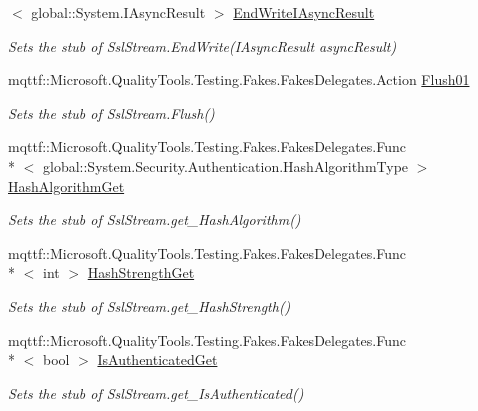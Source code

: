 \begin{DoxyCompactItemize}
$<$ global\-::\-System.\-I\-Async\-Result $>$ \hyperlink{class_system_1_1_net_1_1_security_1_1_fakes_1_1_stub_ssl_stream_aab69be10dcf29d75a2c727837f6e589b}{End\-Write\-I\-Async\-Result}
\begin{DoxyCompactList}\small\item\em Sets the stub of Ssl\-Stream.\-End\-Write(\-I\-Async\-Result async\-Result)\end{DoxyCompactList}\item 
mqttf\-::\-Microsoft.\-Quality\-Tools.\-Testing.\-Fakes.\-Fakes\-Delegates.\-Action \hyperlink{class_system_1_1_net_1_1_security_1_1_fakes_1_1_stub_ssl_stream_adc47c3da205d7e2f128cd9e812fcdea8}{Flush01}
\begin{DoxyCompactList}\small\item\em Sets the stub of Ssl\-Stream.\-Flush()\end{DoxyCompactList}\item 
mqttf\-::\-Microsoft.\-Quality\-Tools.\-Testing.\-Fakes.\-Fakes\-Delegates.\-Func\\*
$<$ global\-::\-System.\-Security.\-Authentication.\-Hash\-Algorithm\-Type $>$ \hyperlink{class_system_1_1_net_1_1_security_1_1_fakes_1_1_stub_ssl_stream_ab262d5b2131d6ca8c1d70eb211203526}{Hash\-Algorithm\-Get}
\begin{DoxyCompactList}\small\item\em Sets the stub of Ssl\-Stream.\-get\-\_\-\-Hash\-Algorithm()\end{DoxyCompactList}\item 
mqttf\-::\-Microsoft.\-Quality\-Tools.\-Testing.\-Fakes.\-Fakes\-Delegates.\-Func\\*
$<$ int $>$ \hyperlink{class_system_1_1_net_1_1_security_1_1_fakes_1_1_stub_ssl_stream_ac022ca28c366a9611d5a66cbdc826cc9}{Hash\-Strength\-Get}
\begin{DoxyCompactList}\small\item\em Sets the stub of Ssl\-Stream.\-get\-\_\-\-Hash\-Strength()\end{DoxyCompactList}\item 
mqttf\-::\-Microsoft.\-Quality\-Tools.\-Testing.\-Fakes.\-Fakes\-Delegates.\-Func\\*
$<$ bool $>$ \hyperlink{class_system_1_1_net_1_1_security_1_1_fakes_1_1_stub_ssl_stream_ab3f765506d38f72b58beb2d5f9bfc195}{Is\-Authenticated\-Get}
\begin{DoxyCompactList}\small\item\em Sets the stub of Ssl\-Stream.\-get\-\_\-\-Is\-Authenticated()\end{DoxyCompactList}\item 

\end{DoxyCompactItemize}
